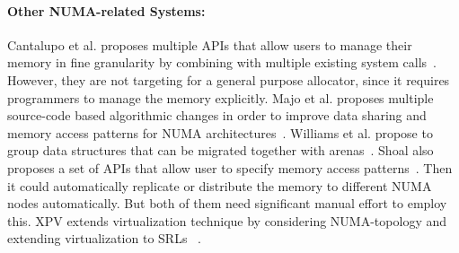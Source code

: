 \paragraph{Other NUMA-related Systems:}
Cantalupo et al. proposes multiple APIs that allow users to manage their memory in fine granularity by combining with multiple existing system calls~\cite{cantalupo2015memkind}. However, they are not targeting for a general purpose allocator, since it requires programmers to manage the memory explicitly.  Majo et al. proposes multiple source-code based  algorithmic changes in order to improve  data sharing and  memory access patterns for NUMA architectures~\cite{6704666}. Williams et al. propose to group data structures that can be migrated together with arenas~\cite{WilliamsI0L18}. 
Shoal also proposes a set of APIs that allow user to specify memory access patterns~\cite{Kaestle:2015:SSA:2813767.2813787}. Then it could automatically replicate or distribute the memory  to different NUMA nodes automatically. But both of them need significant manual effort to employ this. XPV extends virtualization technique by considering NUMA-topology and extending virtualization to SRLs ~\cite{Bui:2019:EPV:3302424.3303960}.

